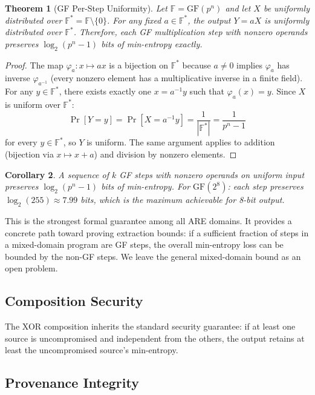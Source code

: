 \documentclass[conference,compsoc]{IEEEtran}
\newtheorem{theorem}{Theorem}[section]
\newtheorem{corollary}[theorem]{Corollary}
\newcommand{\are}{\textsc{ARE}\xspace}
\begin{document}
\begin{theorem}[GF Per-Step Uniformity]
\label{thm:gf-uniform}
Let $\mathbb{F} = \mathrm{GF}(p^n)$ and let $X$ be uniformly
distributed over $\mathbb{F}^* = \mathbb{F} \setminus \{0\}$.
%
For any fixed $a \in \mathbb{F}^*$, the output $Y = aX$ is
uniformly distributed over $\mathbb{F}^*$.
%
Therefore, each GF multiplication step with nonzero operands
preserves $\log_2(p^n - 1)$ bits of min-entropy exactly.
\end{theorem}

\begin{proof}
The map $\varphi_a: x \mapsto ax$ is a bijection on
$\mathbb{F}^*$ because $a \neq 0$ implies $\varphi_a$ has inverse
$\varphi_{a^{-1}}$ (every nonzero element has a multiplicative
inverse in a finite field).
%
For any $y \in \mathbb{F}^*$, there exists exactly one
$x = a^{-1}y$ such that $\varphi_a(x) = y$.
%
Since $X$ is uniform over $\mathbb{F}^*$:
\[
  \Pr[Y = y] = \Pr[X = a^{-1}y] = \frac{1}{|\mathbb{F}^*|}
  = \frac{1}{p^n - 1}
\]
for every $y \in \mathbb{F}^*$, so $Y$ is uniform.
%
The same argument applies to addition (bijection via
$x \mapsto x + a$) and division by nonzero elements.
\end{proof}

\begin{corollary}
\label{cor:gf-chain}
A sequence of $k$ GF steps with nonzero operands on uniform input
preserves $\log_2(p^n - 1)$ bits of min-entropy.
%
For $\mathrm{GF}(2^8)$: each step preserves $\log_2(255) \approx
7.99$ bits, which is the maximum achievable for 8-bit output.
\end{corollary}

This is the strongest formal guarantee among all \are domains.
%
It provides a concrete path toward proving extraction bounds:
if a sufficient fraction of steps in a mixed-domain program are
GF steps, the overall min-entropy loss can be bounded by the
non-GF steps.
%
We leave the general mixed-domain bound as an open problem.

\subsection{Composition Security}
\label{sec:security:composition}

The XOR composition inherits the standard security guarantee: if at
least one source is uncompromised and independent from the others, the
output retains at least the uncompromised source's min-entropy.

\subsection{Provenance Integrity}
\label{sec:security:provenance}
\end{document}

